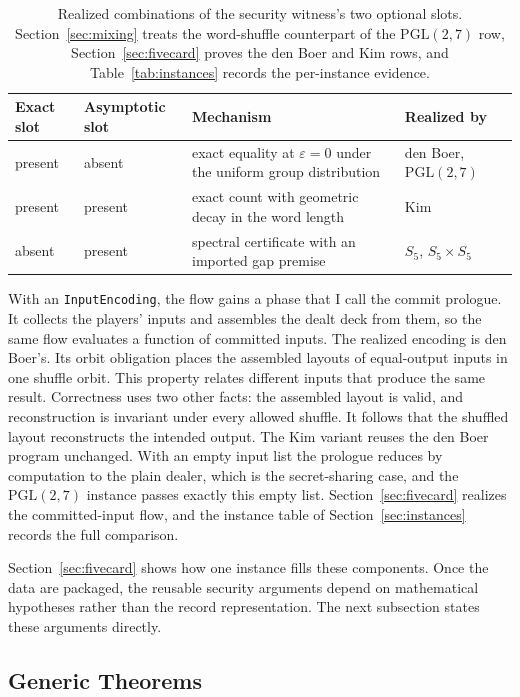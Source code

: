 \documentclass[runningheads]{llncs}
\newcommand{\coqin}[1]{\texttt{#1}}
\newcommand{\PG}{\mathrm{PGL}(2,7)}
\begin{document}
\begin{table}[t]
  \setlength{\tabcolsep}{6pt}
  \centering
  \small
  \begin{tabular}{@{}llL{.32\linewidth}L{.20\linewidth}@{}}
    \toprule
    Exact slot & Asymptotic slot & Mechanism & Realized by \\
    \midrule
    present & absent & exact equality at $\varepsilon=0$ under the uniform
      group distribution & den Boer, $\PG$ \\
    present & present & exact count with geometric decay in the word
      length & Kim \\
    absent & present & spectral certificate with an imported gap premise
      & $S_5$, $S_5\times S_5$ \\
    \bottomrule
  \end{tabular}
  \caption{Realized combinations of the security witness's two optional
  slots. Section~\ref{sec:mixing} treats the word-shuffle counterpart of
  the $\PG$ row, Section~\ref{sec:fivecard} proves the den Boer and Kim
  rows, and Table~\ref{tab:instances} records the per-instance evidence.}
  \label{tab:witness-mechanism}
\end{table}

With an \coqin{InputEncoding}, the flow gains a phase that I call the
commit prologue. It collects the players' inputs and assembles the dealt
deck from them, so the same flow evaluates a function of committed
inputs. The realized encoding is den Boer's. Its
orbit obligation places the assembled layouts of equal-output inputs in one
shuffle orbit. This property relates different inputs that produce the same
result. Correctness uses two other facts: the assembled layout is valid, and
reconstruction is invariant under every allowed shuffle. It follows that the
shuffled layout reconstructs the intended output. The Kim variant reuses the
den Boer program unchanged. With an empty input list
the prologue reduces by computation to the plain dealer, which is the
secret-sharing case, and the $\PG$ instance passes exactly this empty
list. Section~\ref{sec:fivecard} realizes the committed-input flow, and
the instance table of Section~\ref{sec:instances} records the full
comparison.

Section~\ref{sec:fivecard} shows how one instance fills these components.
Once the data are packaged, the reusable security arguments depend on
mathematical hypotheses rather than the record representation. The next
subsection states these arguments directly.

\subsection{Generic Theorems}
\end{document}
